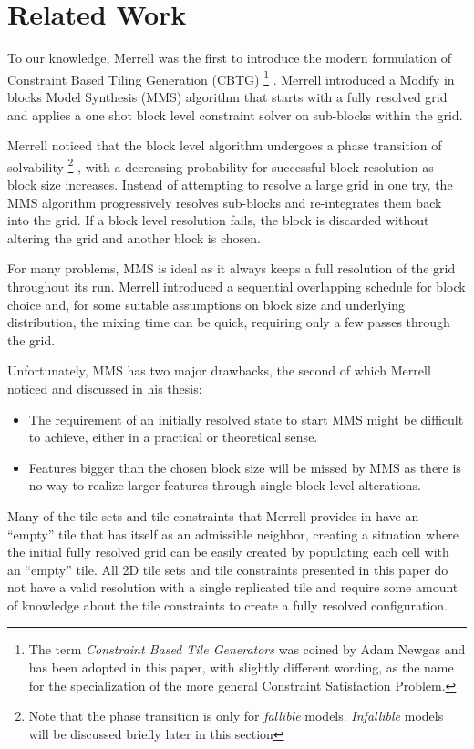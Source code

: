 \section{Related Work}

To our knowledge, Merrell was the first to introduce the modern formulation of Constraint Based Tiling Generation (CBTG)
\footnote{The term \textit{Constraint Based Tile Generators} was coined by Adam Newgas \cite{BorisTheBrave_cbtg_2021} and has been adopted in this paper,
with slightly different wording, as the name for the specialization of the more general Constraint Satisfaction Problem.}
\cite{Merrell_2007, Merrell_2009}.
Merrell introduced a Modify in blocks Model Synthesis (MMS) algorithm that starts with a fully resolved grid
and applies a one shot block level constraint solver on sub-blocks within the grid.

Merrell noticed that the block level algorithm undergoes a phase transition of solvability
\footnote{ Note that the phase transition is only for \textit{fallible} models. \textit{Infallible} models will be discussed briefly later in this section }
, with a decreasing probability
for successful block resolution as block size increases.
Instead of attempting to resolve a large grid in one try, the MMS algorithm progressively resolves sub-blocks and re-integrates them back into the grid.
If a block level resolution fails, the block is discarded without altering the grid and another block is chosen.

For many problems, MMS is ideal as it always keeps a full resolution of the grid throughout its run.
Merrell introduced a sequential overlapping schedule for block choice and, for some suitable assumptions
on block size and underlying distribution, the mixing time can be quick, requiring only a few passes through the grid.

Unfortunately, MMS has two major drawbacks, the second of which Merrell noticed and discussed in his thesis:

\begin{itemize}
  \item The requirement of an initially resolved state to start MMS might be difficult to achieve, either in a practical
        or theoretical sense.
  \item Features bigger than the chosen block size will be missed by MMS as there is no way to realize larger features
        through single block level alterations.
\end{itemize}

Many of the tile sets and tile constraints that Merrell provides in \cite{Merrell_2007, Merrell_2009} have an ``empty'' tile that 
has itself as an admissible neighbor, creating a situation where the initial fully resolved grid can be easily created
by populating each cell with an ``empty'' tile.
All 2D tile sets and tile constraints presented in this paper do not have a valid resolution with a single replicated
tile and require some amount of knowledge about the tile constraints
to create a fully resolved configuration.

